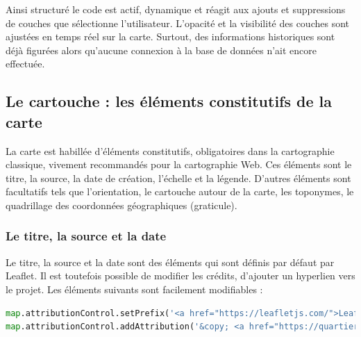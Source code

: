 Ainsi structuré le code est actif, dynamique et réagit aux ajouts et suppressions de couches que sélectionne l'utilisateur. L'opacité et la visibilité des couches sont ajustées en temps réel sur la carte. Surtout, des informations historiques sont déjà figurées alors qu'aucune connexion à la base de données n'ait  encore effectuée.

\subsection{Le cartouche : les éléments constitutifs de la carte}
La carte est habillée d'éléments constitutifs, obligatoires dans la cartographie classique, vivement recommandés pour la cartographie Web. Ces éléments sont le titre, la source, la date de création, l'échelle et la légende. D'autres éléments sont facultatifs tels que l'orientation, le cartouche autour de la carte, les toponymes, le quadrillage des coordonnées géographiques (graticule). 
\subsubsection{Le titre, la source et la date}
Le titre, la source et la date sont des éléments qui sont définis par défaut par Leaflet. Il est toutefois possible de modifier les crédits, d'ajouter un hyperlien vers le projet. Les éléments suivants sont facilement modifiables :
\begin{lstlisting}[language=PYTHON, caption=Changement des attributions de la carte en JavaScript]
map.attributionControl.setPrefix('<a href="https://leafletjs.com/">Leaflet</a>');
map.attributionControl.addAttribution('&copy; <a href="https://quartier-richelieu.inha.fr/">Richelieu.Histoire du quartier</a>, Marina Hervieu, 2024');\end{lstlisting}

